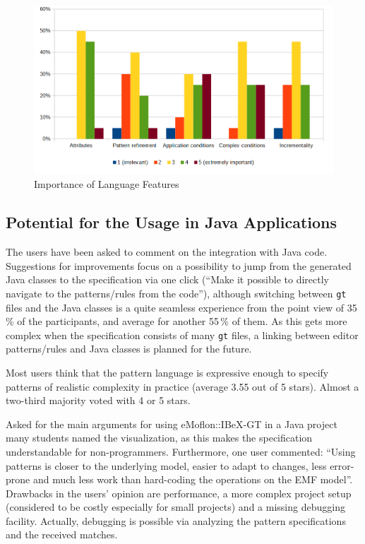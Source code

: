 \begin{figure}[h!]
	\centering
	\includegraphics[width=\linewidth]{../common/figures/evaluation-results-importance-of-features}
	\caption{Importance of Language Features}
	\label{fig:evaluation-results-importance-of-features}
\end{figure}

\subsection{Potential for the Usage in Java Applications}
\label{evaluation-java-integration}
The users have been asked to comment on the integration with Java code.
Suggestions for improvements focus on a possibility to jump from the generated Java classes to the specification via one click (``Make it possible to directly navigate to the patterns/rules from the code''), although switching between \texttt{gt} files and the Java classes is a quite seamless experience from the point view of 35\,\% of the participants, and average for another 55\,\% of them.
As this gets more complex when the specification consists of many \texttt{gt} files, a linking between editor patterns/rules and Java classes is planned for the future.

Most users think that the pattern language is expressive enough to specify patterns of realistic complexity in practice (average 3.55 out of 5 stars).
Almost a two-third majority voted with 4 or 5 stars.

Asked for the main arguments for using eMoflon::IBeX-GT in a Java project many students named the visualization, as this makes the specification understandable for non-programmers.
Furthermore, one user commented: ``Using patterns is closer to the underlying model, easier to adapt to changes, less error-prone and much less work than hard-coding the operations on the EMF model''.
Drawbacks in the users' opinion are performance, a more complex project setup (considered to be costly especially for small projects) and a missing debugging facility.
Actually, debugging is possible via analyzing the pattern specifications and the received matches.

